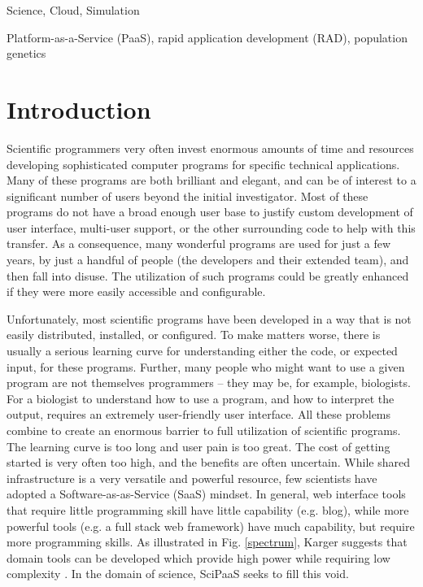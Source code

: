 \documentclass[10pt,reprint]{socc14}
\begin{document}

\terms
Science, Cloud, Simulation

\keywords
Platform-as-a-Service (PaaS), rapid application development (RAD), population genetics

\section{Introduction}

Scientific programmers very often invest enormous amounts of time and resources developing sophisticated computer programs for specific technical applications. Many of these programs are both brilliant and elegant, and can be of interest to a significant number of users beyond the initial investigator. Most of these programs do not have a broad enough user base to justify custom development of user interface, multi-user support, or the other surrounding code to help with this transfer.  As a consequence, many wonderful programs are used for just a few years, by just a handful of people (the developers and their extended team), and then fall into disuse. The utilization of such programs could be greatly enhanced if they were more easily accessible and configurable.

Unfortunately, most scientific programs have been developed in a way that is not easily distributed, installed, or configured. To make matters worse, there is usually a serious learning curve for understanding either the code, or expected input, for these programs. Further, many people who might want to use a given program are not themselves programmers – they may be, for example, biologists.  For a biologist to understand how to use a program, and how to interpret the output, requires an extremely user-friendly user interface.  All these problems combine to create an enormous barrier to full utilization of scientific programs. The learning curve is too long and user pain is too great. The cost of getting started is very often too high, and the benefits are often uncertain.
While shared infrastructure is a very versatile and powerful resource, few scientists have adopted a Software-as-as-Service (SaaS) mindset.
In general, web interface tools that require little programming skill have little capability (e.g. blog), while more powerful tools (e.g. a full stack web framework) have much capability, but require more programming skills. As illustrated in Fig. \ref{spectrum}, Karger suggests that domain tools can be developed which provide high power while requiring low complexity \cite{karger14}. In the domain of science, SciPaaS seeks to fill this void.
\end{document}
